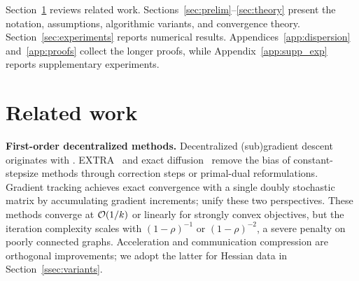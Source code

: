 \documentclass[review,onefignum,onetabnum]{siamart171218}
\begin{document}
	Section~\ref{sec:related} reviews related work.
	Sections~\ref{sec:prelim}--\ref{sec:theory} present the notation, assumptions, algorithmic variants, and convergence theory.
	Section~\ref{sec:experiments} reports numerical results.
	Appendices~\ref{app:dispersion} and~\ref{app:proofs} collect the longer proofs, while Appendix~\ref{app:supp_exp} reports supplementary experiments.
	
	\section{Related work}\label{sec:related}
	
	\noindent\textbf{First-order decentralized methods.}
	Decentralized (sub)gradient descent originates with
	\citet{nedic2009subgradient}.
	EXTRA~\citep{shi2015extra} and exact
	diffusion~\citep{yuan2019exactdiffusion} remove the bias of
	constant-stepsize methods through correction steps or primal-dual
	reformulations.
	Gradient tracking
	\citep{nedic2017diging,xin2020distributed,pu2021distributed}
	achieves exact convergence with a single doubly stochastic matrix
	by accumulating gradient increments;
	\citet{alghunaim2021decentralized} unify these two perspectives.
	These methods converge at $\mathcal{O}(1/k)$ or linearly for strongly convex
	objectives, but the iteration complexity scales with
	$(1-\rho)^{-1}$ or $(1-\rho)^{-2}$, a severe penalty on poorly
	connected graphs.
	Acceleration \citep{jakovetic2014fast,li2024decentralized} and
	communication compression
	\citep{koloskova2019decentralized,beznosikov2022biased} are
	orthogonal improvements; we adopt the latter for Hessian data
	in Section~\ref{ssec:variants}.
	
\end{document}
